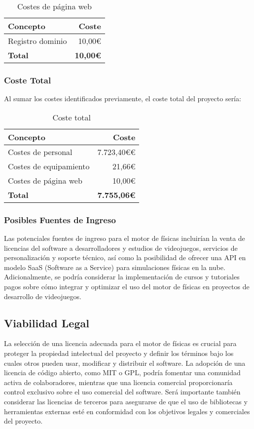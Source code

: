 \begin{table}[h]
\centering
\begin{tabular}{| l | r |}
\hline
Concepto & Coste \\ \hline
Registro dominio & 10,00€ \\ \hline
\textbf{Total} & \textbf{10,00€} \\ \hline
\end{tabular}
\caption{Costes de página web}
\end{table}

\subsubsection{Coste Total}
Al sumar los costes identificados previamente, el coste total del proyecto sería:

\begin{table}[h]
\centering
\begin{tabular}{| l | r |}
\hline
Concepto & Coste \\ \hline
Costes de personal & 7.723,40€€ \\
Costes de equipamiento & 21,66€ \\
Costes de página web & 10,00€ \\ \hline
\textbf{Total} & \textbf{7.755,06€} \\ \hline
\end{tabular}
\caption{Coste total}
\end{table}

\subsubsection{Posibles Fuentes de Ingreso}
Las potenciales fuentes de ingreso para el motor de físicas incluirían la venta de licencias del software a desarrolladores y estudios de videojuegos, servicios de personalización y soporte técnico, así como la posibilidad de ofrecer una API en modelo SaaS (Software as a Service) para simulaciones físicas en la nube. Adicionalmente, se podría considerar la implementación de cursos y tutoriales pagos sobre cómo integrar y optimizar el uso del motor de físicas en proyectos de desarrollo de videojuegos.

\subsection{Viabilidad Legal}
La selección de una licencia adecuada para el motor de físicas es crucial para proteger la propiedad intelectual del proyecto y definir los términos bajo los cuales otros pueden usar, modificar y distribuir el software. La adopción de una licencia de código abierto, como MIT o GPL, podría fomentar una comunidad activa de colaboradores, mientras que una licencia comercial proporcionaría control exclusivo sobre el uso comercial del software. Será importante también considerar las licencias de terceros para asegurarse de que el uso de bibliotecas y herramientas externas esté en conformidad con los objetivos legales y comerciales del proyecto.

